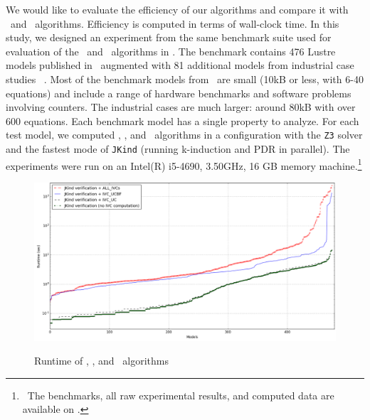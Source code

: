 
\newcommand{\takeaway}[1]{
\vspace{6pt}
\noindent\fbox{\parbox{\textwidth}{#1}}
\vspace{6pt}
}

 We would like to evaluate the efficiency
 of our algorithms and compare it with \ucalg ~and \ucbfalg ~algorithms.
 Efficiency is computed in terms of wall-clock time.
 In this study, we designed an experiment from
 the same benchmark suite used for evaluation of the \ucalg ~and \ucbfalg ~algorithms in \cite{Ghass16}.
 The benchmark contains 476 Lustre models
 published in~\cite{Hagen08:FMCAD} augmented
with 81 additional models from industrial case studies ~\cite{QFCS15:backes,hilt2013}.
 Most of
the benchmark models from~\cite{Hagen08:FMCAD} are small (10kB or less,
with 6-40 equations) and include a range of hardware benchmarks and
software problems involving counters.
The industrial cases are much
larger: around 80kB with over 600 equations.
Each benchmark model has a single property to analyze.
For each test model, we computed \aivcalg , \ucalg , and \ucbfalg ~algorithms
in a configuration with
the \texttt{Z3} solver and the fastest mode of \texttt{JKind} (running k-induction and PDR in parallel). The experiments
were run on an  Intel(R) i5-4690, 3.50GHz,
16 GB memory machine.\footnote{\noindent ~The benchmarks, all raw experimental results,
  and computed data are available on \cite{expr}.}

\begin{figure}[t]
 \centering
  \includegraphics[width=\textwidth]{figs/performance-sorted.png}
  \label{fig:performance}
  \vspace{-0.2in}
  \caption{Runtime of \aivcalg, \ucbfalg, and \ucalg ~algorithms}
\end{figure}

